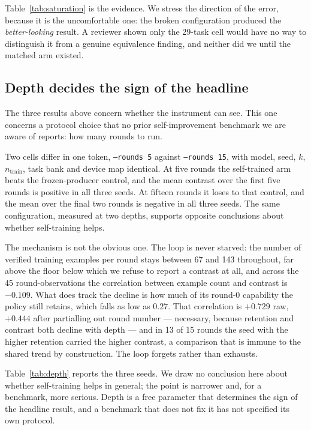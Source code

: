 Table~\ref{tab:saturation} is the evidence. We stress the direction of the error, because it is
the uncomfortable one: the broken configuration produced the \emph{better-looking} result. A
reviewer shown only the 29-task cell would have no way to distinguish it from a genuine
equivalence finding, and neither did we until the matched arm existed.

\subsection{Depth decides the sign of the headline}
\label{sec:motivation:depth}

The three results above concern whether the instrument can see. This one concerns a protocol
choice that no prior self-improvement benchmark we are aware of reports: how many rounds to run.

Two cells differ in one token, \texttt{--rounds 5} against \texttt{--rounds 15}, with model,
seed, $k$, $n_{\mathrm{train}}$, task bank and device map identical. At five rounds the
self-trained arm beats the frozen-producer control, and the mean contrast over the first five
rounds is positive in all three seeds. At fifteen rounds it loses to that control, and the mean
over the final two rounds is negative in all three seeds. The same configuration, measured at
two depths, supports opposite conclusions about whether self-training helps.

The mechanism is not the obvious one. The loop is never starved: the number of verified training
examples per round stays between 67 and 143 throughout, far above the floor below which we
refuse to report a contrast at all, and across the 45 round-observations the correlation between
example count and contrast is $-0.109$. What does track the decline is how much of its round-0
capability the policy still retains, which falls as low as $0.27$. That correlation is $+0.729$
raw, $+0.444$ after partialling out round number --- necessary, because retention and contrast
both decline with depth --- and in 13 of 15 rounds the seed with the higher retention carried
the higher contrast, a comparison that is immune to the shared trend by construction. The loop
forgets rather than exhausts.

Table~\ref{tab:depth} reports the three seeds. We draw no conclusion here about whether
self-training helps in general; the point is narrower and, for a benchmark, more serious. Depth
is a free parameter that determines the sign of the headline result, and a benchmark that does
not fix it has not specified its own protocol.

